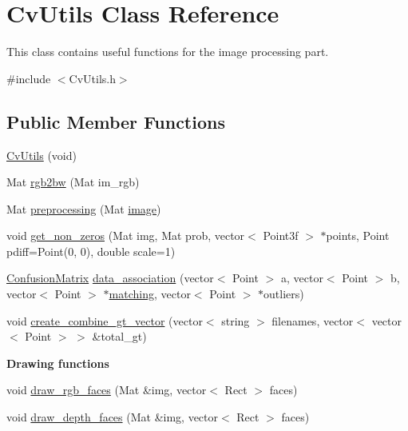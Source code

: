 \hypertarget{classCvUtils}{\section{Cv\-Utils Class Reference}
\label{classCvUtils}
}


This class contains useful functions for the image processing part.  




{\ttfamily \#include $<$Cv\-Utils.\-h$>$}

\subsection*{Public Member Functions}
\begin{DoxyCompactItemize}
\item 
\hyperlink{classCvUtils_ad292f6ff1df46556644e3161d048b3aa}{Cv\-Utils} (void)
\item 
Mat \hyperlink{classCvUtils_aa5bded11699d39af25c420aed2ade0ba}{rgb2bw} (Mat im\-\_\-rgb)
\item 
Mat \hyperlink{classCvUtils_a47189479acb67a1918f35557fc5906a6}{preprocessing} (Mat \hyperlink{create__ground__truth_8cpp_aabb27b8973575043030df51be47cd24a}{image})
\item 
void \hyperlink{classCvUtils_a426439fc003e5557644932eee66c48b6}{get\-\_\-non\-\_\-zeros} (Mat img, Mat prob, vector$<$ Point3f $>$ $\ast$points, Point pdiff=Point(0, 0), double scale=1)
\item 
\hyperlink{classConfusionMatrix}{Confusion\-Matrix} \hyperlink{classCvUtils_a9c29ba0ac7ad60b0f823c06f515163b4}{data\-\_\-association} (vector$<$ Point $>$ a, vector$<$ Point $>$ b, vector$<$ Point $>$ $\ast$\hyperlink{social__robot__onethread_8cpp_a1ad5e89ff23cfb6db193cfd737de72f1}{matching}, vector$<$ Point $>$ $\ast$outliers)
\item 
void \hyperlink{classCvUtils_aaea7203de435f3395fb4842c5230ecc7}{create\-\_\-combine\-\_\-gt\-\_\-vector} (vector$<$ string $>$ filenames, vector$<$ vector$<$ Point $>$ $>$ \&total\-\_\-gt)
\end{DoxyCompactItemize}
\begin{Indent}{\bf Drawing functions}\par
\begin{DoxyCompactItemize}
\item 
void \hyperlink{classCvUtils_a74249b2e9b76b2a8ae2c01c4ff496663}{draw\-\_\-rgb\-\_\-faces} (Mat \&img, vector$<$ Rect $>$ faces)
\item 
void \hyperlink{classCvUtils_a6e1f3369c2b553c06f2692c75e20667d}{draw\-\_\-depth\-\_\-faces} (Mat \&img, vector$<$ Rect $>$ faces)
\end{DoxyCompactItemize}
\end{Indent}
